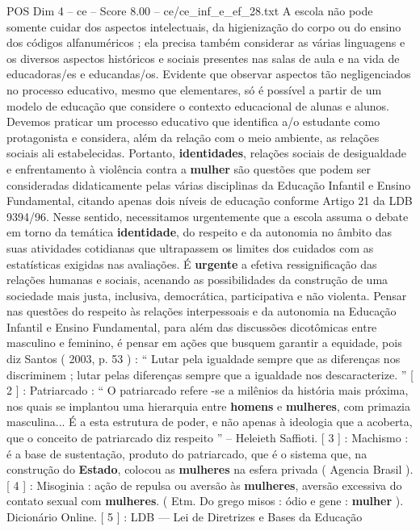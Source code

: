 \begin{textsample}{POS Dim 4 – ce – Score 8.00 – ce/ce\_inf\_e\_ef\_28.txt}
A escola não pode somente cuidar dos aspectos intelectuais, da higienização do corpo ou do ensino dos códigos alfanuméricos ; ela precisa também considerar as várias linguagens e os diversos aspectos históricos e sociais presentes nas salas de aula e na vida de educadoras/es e educandas/os.
Evidente que observar aspectos tão negligenciados no processo educativo, mesmo que elementares, só é possível a partir de um modelo de educação que considere o contexto educacional de alunas e alunos.
Devemos praticar um processo educativo que identifica a/o estudante como protagonista e considera, além da relação com o meio ambiente, as relações sociais ali estabelecidas.
Portanto, \textbf{identidades}, relações sociais de desigualdade e enfrentamento à violência contra a \textbf{mulher} são questões que podem ser consideradas didaticamente pelas várias disciplinas da Educação Infantil e Ensino Fundamental, citando apenas dois níveis de educação conforme Artigo 21 da LDB 9394/96.
Nesse sentido, necessitamos urgentemente que a escola assuma o debate em torno da temática \textbf{identidade}, do respeito e da autonomia no âmbito das suas atividades cotidianas que ultrapassem os limites dos cuidados com as estatísticas exigidas nas avaliações.
É \textbf{urgente} a efetiva ressignificação das relações humanas e sociais, acenando as possibilidades da construção de uma sociedade mais justa, inclusiva, democrática, participativa e não violenta.
Pensar nas questões do respeito às relações interpessoais e da autonomia na Educação Infantil e Ensino Fundamental, para além das discussões dicotômicas entre masculino e feminino, é pensar em ações que busquem garantir a equidade, pois diz Santos ( 2003, p. 53 ) : “ Lutar pela igualdade sempre que as diferenças nos discriminem ; lutar pelas diferenças sempre que a igualdade nos descaracterize. ” [ 2 ] : Patriarcado : “ O patriarcado refere -se a milênios da história mais próxima, nos quais se implantou uma hierarquia entre \textbf{homens} e \textbf{mulheres}, com primazia masculina...
É a esta estrutura de poder, e não apenas à ideologia que a acoberta, que o conceito de patriarcado diz respeito ” – Heleieth Saffioti. [ 3 ] : Machismo : é a base de sustentação, produto do patriarcado, que é o sistema que, na construção do \textbf{Estado}, colocou as \textbf{mulheres} na esfera privada ( Agencia Brasil ). [ 4 ] : Misoginia : ação de repulsa ou aversão às \textbf{mulheres}, aversão excessiva do contato sexual com \textbf{mulheres}. ( Etm.
Do grego misos : ódio e gene : \textbf{mulher} ).
Dicionário Online. [ 5 ] : LDB — Lei de Diretrizes e Bases da Educação

\end{textsample}
